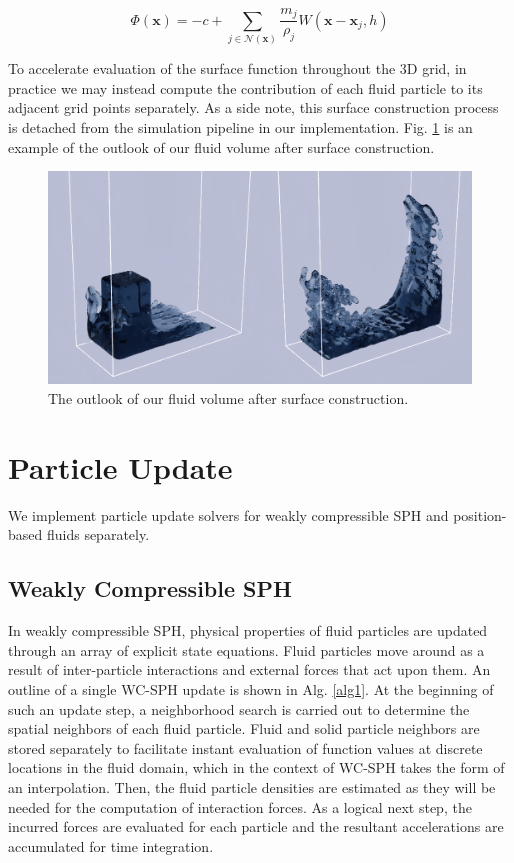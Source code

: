 \documentclass[
	11pt, 
	DIV10,
	ngerman,
	a4paper, 
	oneside, 
	headings=normal, 
	captions=tableheading,
	final, 
	numbers=noenddot
]{scrartcl}
\begin{document}
\begin{equation}
	\label{eq17}
	\Phi(\mathbf{x}) = - c + \sum_{j \in \mathcal{N}(\mathbf{x})} \frac{m_{j}}{\rho_{j}} W(\mathbf{x} - \mathbf{x}_{j}, h)
\end{equation} 

To accelerate evaluation of the surface function throughout the 3D grid, in practice we may instead compute the contribution of each fluid particle to its adjacent grid points separately. As a side note, this surface construction process is detached from the simulation pipeline in our implementation. Fig. \ref{fig:surface} is an example of the outlook of our fluid volume after surface construction.

\begin{figure}[h]
    \centering
    \includegraphics[width=.6\textwidth]{pics/surface.png}
    \caption{The outlook of our fluid volume after surface construction.}
    \label{fig:surface}
\end{figure}

\section{Particle Update}
\label{sec3}

We implement particle update solvers for weakly compressible SPH and position-based fluids separately.

\subsection{Weakly Compressible SPH}

In weakly compressible SPH, physical properties of fluid particles are updated through an array of explicit state equations. Fluid particles move around as a result of inter-particle interactions and external forces that act upon them. An outline of a single WC-SPH update is shown in Alg. \ref{alg1}. At the beginning of such an update step, a neighborhood search is carried out to determine the spatial neighbors of each fluid particle. Fluid and solid particle neighbors are stored separately to facilitate instant evaluation of function values at discrete locations in the fluid domain, which in the context of WC-SPH takes the form of an interpolation. Then, the fluid particle densities are estimated as they will be needed for the computation of interaction forces. As a logical next step, the incurred forces are evaluated for each particle and the resultant accelerations are accumulated for time integration.
\end{document}
